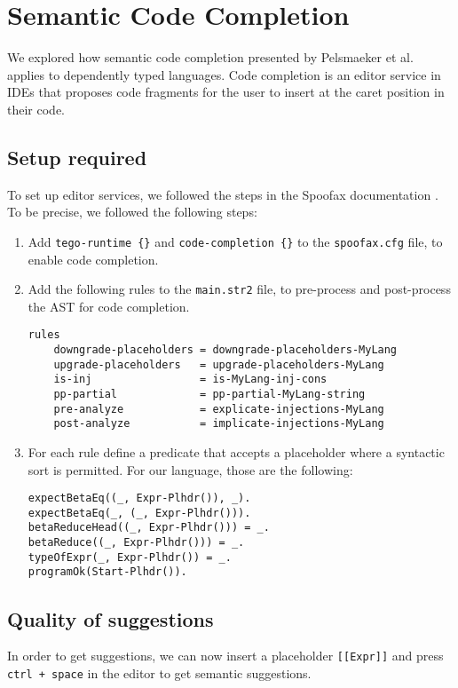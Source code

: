 \chapter{\label{chap:editor-services}Semantic Code Completion}
 
We explored how semantic code completion presented by Pelsmaeker et al.~\cite{codecompletion} applies to dependently typed languages. Code completion is an editor service in IDEs that proposes code fragments for the user to insert at the caret position in their code.

\section{Setup required}
To set up editor services, we followed the steps in the Spoofax documentation \cite{semcomplet}. To be precise, we followed the following steps:
\begin{enumerate}
	\item Add \verb|tego-runtime {}| and \verb|code-completion {}| to the \verb|spoofax.cfg| file, to enable code completion.
	\item Add the following rules to the \verb|main.str2| file, to pre-process and post-process the AST for code completion.
	\begin{lstlisting}
rules
	downgrade-placeholders = downgrade-placeholders-MyLang
	upgrade-placeholders   = upgrade-placeholders-MyLang
	is-inj                 = is-MyLang-inj-cons
	pp-partial             = pp-partial-MyLang-string
	pre-analyze            = explicate-injections-MyLang
	post-analyze           = implicate-injections-MyLang
	\end{lstlisting}
	\item For each rule define a predicate that accepts a placeholder where a syntactic sort is permitted. For our language, those are the following:
	\begin{lstlisting}
expectBetaEq((_, Expr-Plhdr()), _).
expectBetaEq(_, (_, Expr-Plhdr())).
betaReduceHead((_, Expr-Plhdr())) = _.
betaReduce((_, Expr-Plhdr())) = _.
typeOfExpr(_, Expr-Plhdr()) = _.
programOk(Start-Plhdr()).
	\end{lstlisting}
	
\end{enumerate}

\section{Quality of suggestions}
In order to get suggestions, we can now insert a placeholder \verb|[[Expr]]| and press \verb|ctrl + space| in the editor to get semantic suggestions.

